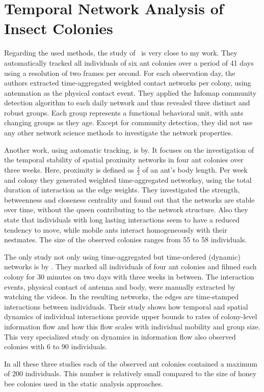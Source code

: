 \section{Temporal Network Analysis of Insect Colonies}

Regarding the used methods, the study of~\textcite{mersch2013tracking} is very close to my work.
They automatically tracked all individuals of six ant colonies over a period of 41 days using a resolution of two frames per second.
For each observation day, the authors extracted time-aggregated weighted contact networks per colony, using antennation as the physical contact event.
They applied the Infomap community detection algorithm to each daily network and thus revealed three distinct and robust groups.
Each group represents a functional behavioral unit, with ants changing groups as they age.
Except for community detection, they did not use any other network science methods to investigate the network properties.


Another work, using automatic tracking, is by\textcite{jeanson2012long}.
It focuses on the investigation of the temporal stability of spatial proximity networks in four ant colonies over three weeks.
Here, proximity is defined as $\frac{4}{3}$ of an ant’s body length.
Per week and colony they generated weighted time-aggregated networksy,  using the total duration of interaction as the edge weights.
They investigated the strength, betweenness and closeness centrality and found out that the networks are stable over time, without the queen contributing to the network structure.
Also they state that individuals with long lasting interactions seem to have a reduced tendency to move, while mobile ants interact homogeneously with their nestmates.
The size of the observed colonies ranges from 55 to 58 individuals.


The only study not only using time-aggregated but time-ordered (dynamic) networks is by \textcite{blonder2011time}.
They marked all individuals of four ant colonies and filmed each colony for 30 minutes on two days with three weeks in between.
The interaction events, physical contact of antenna and body, were manually extracted by watching the videos. In the resulting networks, the edges are  time-stamped interactions between individuals.
Their study shows how temporal and spatial dynamics of individual interactions provide upper bounds to rates of colony-level information flow and how this flow scales with individual mobility and group size.
This very specialized study on dynamics in information flow also observed colonies with 6 to 90 individuals.


In all these three studies each of the observed ant colonies contained a maximum of 200 individuals. This number is relatively small compared to the size of honey bee colonies used in the static analysis approaches.


